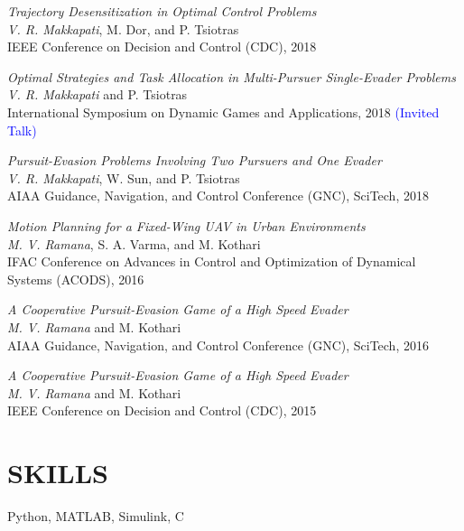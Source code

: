 \documentclass[margin, 10pt]{res} %
\newcommand{\ak}[1]{\textcolor{blue}{#1}}
\begin{document}
\begin{resume}
{\sl Trajectory Desensitization in Optimal Control Problems} \\
\textit{V. R. Makkapati}, M. Dor, and P. Tsiotras \\
IEEE Conference on Decision and Control (CDC), 2018 

{\sl Optimal Strategies and Task Allocation in Multi-Pursuer Single-Evader Problems}\\
\textit{V. R. Makkapati} and P. Tsiotras \\
International Symposium on Dynamic Games and Applications, 2018 \ak{(Invited Talk)}

{\sl Pursuit-Evasion Problems Involving Two Pursuers and One Evader} \\ 
\textit{V. R. Makkapati}, W. Sun, and P. Tsiotras \\
AIAA Guidance, Navigation, and Control Conference (GNC), SciTech, 2018

{\sl Motion Planning for a Fixed-Wing UAV in Urban Environments} \\
\textit{M. V. Ramana}, S. A. Varma, and M. Kothari \\
IFAC Conference on Advances in Control and Optimization of Dynamical Systems (ACODS), 2016

{\sl A Cooperative Pursuit-Evasion Game of a High Speed Evader} \\
\textit{M. V. Ramana} and M. Kothari \\
AIAA Guidance, Navigation, and Control Conference (GNC), SciTech, 2016

{\sl A Cooperative Pursuit-Evasion Game of a High Speed Evader} \\
\textit{M. V. Ramana} and M. Kothari \\
IEEE Conference on Decision and Control (CDC), 2015


\section{SKILLS}
Python, MATLAB, Simulink, C




\end{resume}
\end{document}
